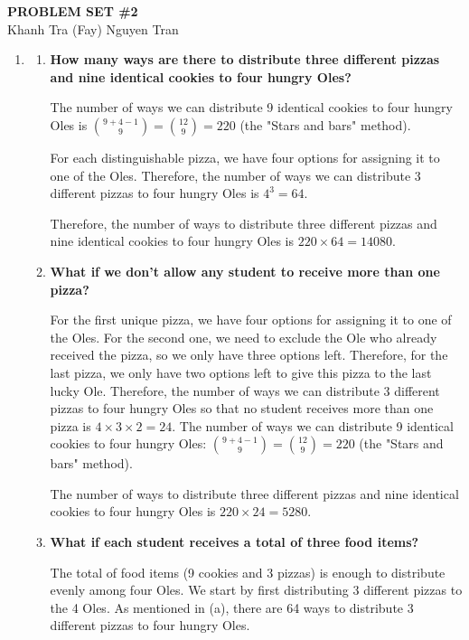 \documentclass[10pt]{article}
\begin{document}
\begin{center}
\textbf{PROBLEM SET \#2}\\
Khanh Tra (Fay) Nguyen Tran
\end{center}

\begin{enumerate}

\item
\begin{enumerate}
\item
\textbf{How many ways are there to distribute three different pizzas and nine identical cookies to four hungry Oles?}

The number of ways we can distribute 9 identical cookies to four hungry Oles is $\binom{9+4 - 1}{9}=\binom{12}{9}=220$ (the "Stars and bars" method). 

For each distinguishable pizza, we have four options for assigning it to one of the Oles. Therefore, the number of ways we can distribute 3 different pizzas to four hungry Oles is $4^3=64$.

Therefore, the number of ways to distribute three different pizzas and nine identical cookies to four hungry Oles is $220 \times 64 = 14080$.

\item
\textbf{What if we don't allow any student to receive more than one pizza?}

For the first unique pizza, we have four options for assigning it to one of the Oles. For the second one, we need to exclude the Ole who already received the pizza, so we only have three options left. Therefore, for the last pizza, we only have two options left to give this pizza to the last lucky Ole. Therefore, the number of ways we can distribute 3 different pizzas to four hungry Oles so that no student receives more than one pizza is $4 \times 3 \times 2 = 24$. The number of ways we can distribute 9 identical cookies to four hungry Oles: $\binom{9+4 - 1}{9}=\binom{12}{9}=220$ (the "Stars and bars" method). 

The number of ways to distribute three different pizzas and nine identical cookies to four hungry Oles is $220 \times 24 = 5280$.

\item
\textbf{What if each student receives a total of three food items?}

The total of food items (9 cookies and 3 pizzas) is enough to distribute evenly among four Oles. We start by first distributing 3 different pizzas to the 4 Oles. As mentioned in (a), there are 64 ways to distribute 3 different pizzas to four hungry Oles.


\end{enumerate}
\end{enumerate}
\end{document}
